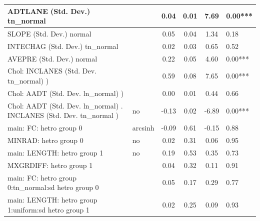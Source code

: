 \begin{table}
\begin{center}
\begin{tabular}{|l|l|c|c|c|l|}
			\hline
			ADTLANE (Std. Dev.) tn_normal &  & 0.04 & 0.01 & 7.69 & 0.00*** \\
			\hline
			SLOPE (Std. Dev.) normal &  & 0.05 & 0.04 & 1.34 & 0.18 \\
			\hline
			INTECHAG (Std. Dev.) tn_normal &  & 0.02 & 0.03 & 0.65 & 0.52 \\
			\hline
			AVEPRE (Std. Dev.) normal &  & 0.22 & 0.05 & 4.60 & 0.00*** \\
			\hline
			 Chol: INCLANES (Std. Dev. tn_normal) ) &  & 0.59 & 0.08 & 7.65 & 0.00*** \\
			\hline
			 Chol: AADT (Std. Dev. ln_normal) ) &  & 0.00 & 0.01 & 0.44 & 0.66 \\
			\hline
			 Chol: AADT (Std. Dev. ln_normal) . INCLANES (Std. Dev.   tn_normal ) & no & -0.13 & 0.02 & -6.89 & 0.00*** \\
			\hline
			main: FC: hetro group 0 & arcsinh & -0.09 & 0.61 & -0.15 & 0.88 \\
			\hline
			MINRAD: hetro group 0 & no & 0.02 & 0.31 & 0.06 & 0.95 \\
			\hline
			main: LENGTH: hetro group 1 & no & 0.19 & 0.53 & 0.35 & 0.73 \\
			\hline
			MXGRDIFF: hetro group 1 &  & 0.04 & 0.32 & 0.11 & 0.91 \\
			\hline
			main: FC: hetro group 0:tn_normal:sd  hetro group 0 &  & 0.05 & 0.17 & 0.29 & 0.77 \\
			\hline
			main: LENGTH: hetro group 1:uniform:sd  hetro group 1 &  & 0.02 & 0.25 & 0.09 & 0.93 \\
			\hline
		\end{tabular}
	\end{center}
\end{table}